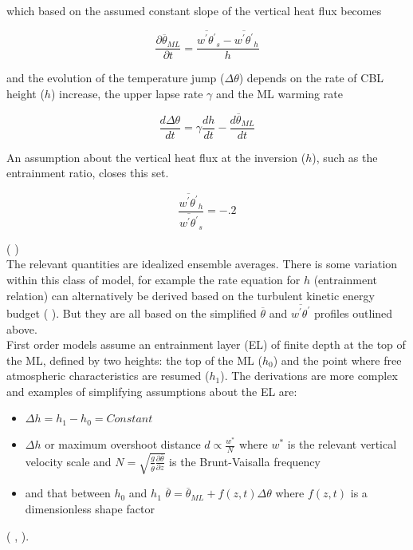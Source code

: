 which based on the assumed constant slope of the vertical heat flux becomes

\begin{equation}
\frac{\partial \overline{\theta}_{ML}}{\partial t} = \frac{\overline{w^{'}\theta^{'}}_{s}-\overline{w^{'}\theta^{'}}_{h}}{h}
\end{equation}

and the evolution of the temperature jump ($\Delta \theta$) depends on the rate of \acs{CBL} height ($h$) increase, 
the upper lapse rate $\gamma$ and the \acs{ML} warming rate
  
\begin{equation}
\frac{d\Delta \theta}{dt} = \gamma\frac{dh}{dt} - \frac{d\overline{\theta}_{ML}}{dt}
\end{equation}

An assumption about the vertical heat flux at the inversion ($h$), such as the entrainment ratio, closes this set.

\begin{equation}
\frac{\overline{w^{'}\theta^{'}}_{h}}{\overline{w^{'}\theta^{'}}_{s}} = -.2
\end{equation}


(\citeauthor{Tennekes73} \cite{Tennekes73})\\

The relevant quantities are idealized ensemble averages. There is some variation within this class of model, for example 
the rate equation for $h$ (entrainment relation) can alternatively be derived based on the turbulent kinetic energy budget 
(\citeauthor{FedConzMir04} \cite{FedConzMir04}).  But they are all based on the simplified $\overline{\theta}$ and 
$\overline{w^{'}\theta^{'}}$ profiles outlined above.\\  

First order models assume an entrainment layer (\acs{EL}) of finite depth at the top of the ML, defined by two heights:
the top of the ML ($h_{0}$) and the point where free atmospheric characteristics are resumed ($h_{1}$).  The derivations are more complex and 
examples of simplifying assumptions about the \acs{EL} are: 
\begin{itemize}
\item{$\Delta h = h_{1} - h_{0} = Constant$
}
\item{$\Delta h$ or maximum 
overshoot distance $d \propto \frac{w^{*}}{N}$ where $w^{*}$ is the relevant vertical velocity scale and $N = \sqrt{\frac{g}{\overline{\theta}} \frac{\partial \overline{\theta}}{\partial z}}$ is the Brunt-Vaisalla frequency}
 \item{and that between $h_{0}$ and $h_{1}$ $\overline{\theta} = \overline{\theta}_{ML} + f(z,t) \Delta \theta$ where $f(z,t)$ is a dimensionless shape factor}
\end{itemize}
 (\citeauthor{Deardorff79} \cite{Deardorff79}, \citeauthor{Stull73} \cite{Stull73}).\\

